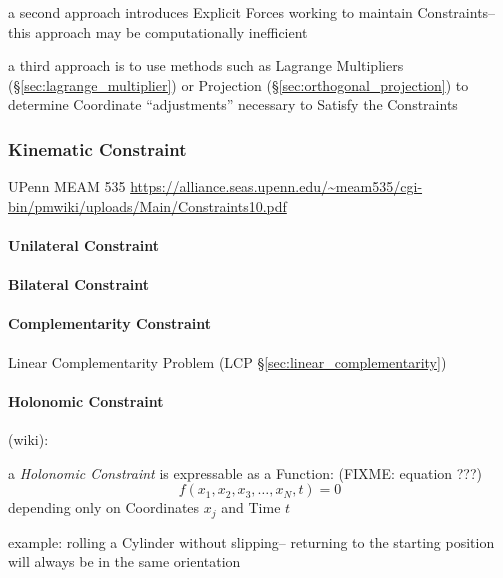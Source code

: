 a second approach introduces Explicit Forces working to maintain Constraints--
this approach may be computationally inefficient

a third approach is to use methods such as Lagrange Multipliers
(\S\ref{sec:lagrange_multiplier}) or Projection
(\S\ref{sec:orthogonal_projection}) to determine Coordinate ``adjustments''
necessary to Satisfy the Constraints



\subsubsection{Kinematic Constraint}\label{sec:kinematic_constraint}


UPenn MEAM 535
\url{https://alliance.seas.upenn.edu/~meam535/cgi-bin/pmwiki/uploads/Main/Constraints10.pdf}



\paragraph{Unilateral Constraint}\label{sec:unilateral_constraint}\hfill

\paragraph{Bilateral Constraint}\label{sec:bilateral_constraint}\hfill

\paragraph{Complementarity Constraint}
\label{sec:complementarity_constraint}\hfill

\fist Linear Complementarity Problem (LCP \S\ref{sec:linear_complementarity})



\paragraph{Holonomic Constraint}\label{sec:holonomic_constraint}\hfill

(wiki):

a \emph{Holonomic Constraint} is expressable as a Function: (FIXME: equation
???)
\[
  f(x_1, x_2, x_3, \ldots, x_N, t) = 0
\]
depending only on Coordinates $x_j$ and Time $t$

example: rolling a Cylinder without slipping-- returning to the starting
position will always be in the same orientation

